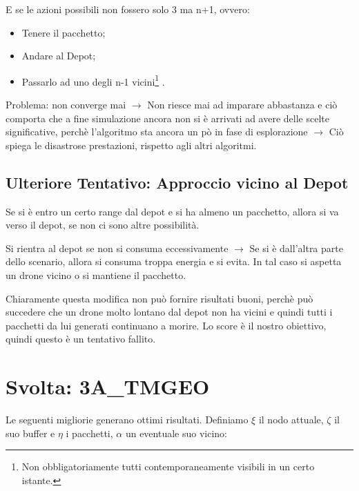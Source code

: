 \documentclass[12pt]{article}
\begin{document}
E se le azioni possibili non fossero solo 3 ma n+1, ovvero:

\begin{itemize}

    \item Tenere il pacchetto;
    \item Andare al Depot;
    \item Passarlo ad uno degli n-1 vicini\footnote{Non obbligatoriamente tutti contemporaneamente visibili in un certo istante.}
    .
\end{itemize}

Problema: non converge mai $\rightarrow$ Non riesce mai ad imparare abbastanza e ciò comporta che a fine simulazione ancora non si è arrivati ad avere delle scelte significative, perchè l'algoritmo sta ancora un pò in fase di esplorazione $\rightarrow$ Ciò spiega le disastrose prestazioni, rispetto agli altri algoritmi.

    
\subsection{Ulteriore Tentativo: Approccio vicino al Depot}

Se si è entro un certo range dal depot e si ha almeno un pacchetto, allora si va verso il depot, se non ci sono altre possibilità. 

Si rientra al depot se non si consuma eccessivamente $\rightarrow$ Se si è dall'altra parte dello scenario, allora si consuma troppa energia e si evita. In tal caso si aspetta un drone vicino o si mantiene il pacchetto.

Chiaramente questa modifica non può fornire risultati buoni, perchè può succedere che un drone molto lontano dal depot non ha vicini e quindi tutti i pacchetti da lui generati continuano a morire. Lo score è il nostro obiettivo, quindi questo è un tentativo fallito.

\section{Svolta: 3A\_TMGEO}

Le seguenti migliorie generano ottimi risultati. Definiamo $\xi$ il nodo attuale, $\zeta$ il suo buffer e $\eta$ i pacchetti, $\alpha$ un eventuale suo vicino:
\end{document}
